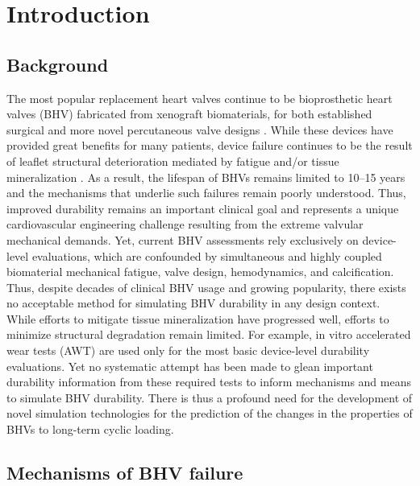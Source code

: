 \section{Introduction}

\subsection{Background}
    The most popular replacement heart valves continue to be bioprosthetic heart valves (BHV) fabricated from xenograft biomaterials, for both established surgical and more novel percutaneous valve designs \cite{schoen_evolving_2008,schoen_new_2006,schoen_cardiac_2005,schoen_calcification_2005,schoen_pathology_2001}. While these devices have provided great benefits for many patients, device failure continues to be the result of leaflet structural deterioration mediated by fatigue and/or tissue mineralization \cite{vesely_tissue_2001,sacks_collagen_2002}. As a result, the lifespan of BHVs remains limited to 10–15 years and the mechanisms that underlie such failures remain poorly understood. Thus, improved durability remains an important clinical goal and represents a unique cardiovascular engineering challenge resulting from the extreme valvular mechanical demands. Yet, current BHV assessments rely exclusively on device-level evaluations, which are confounded by simultaneous and highly coupled biomaterial mechanical fatigue, valve design, hemodynamics, and calcification. Thus, despite decades of clinical BHV usage and growing popularity, there exists no acceptable method for simulating BHV durability in any design context. While efforts to mitigate tissue mineralization have progressed well, efforts to minimize structural degradation remain limited. For example, in vitro accelerated wear tests (AWT) are used only for the most basic device-level durability evaluations. Yet no systematic attempt has been made to glean important durability information from these required tests to inform mechanisms and means to simulate BHV durability. There is thus a profound need for the development of novel simulation technologies for the prediction of the changes in the properties of BHVs to long-term cyclic loading.
    
    
\subsection{Mechanisms of BHV failure}

